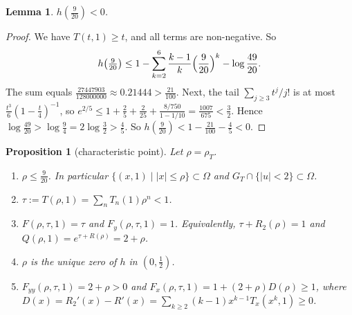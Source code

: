 \documentclass[11pt]{amsart}
\newtheorem{lemma}[theorem]{Lemma}
\newtheorem{proposition}[theorem]{Proposition}
\theoremstyle{definition}
\theoremstyle{remark}
\numberwithin{equation}{section}
\newcommand{\abs}[1]{\lvert #1\rvert}
\begin{document}
\begin{lemma}\label{lem:h}
\(h(\frac9{20})<0\).
\end{lemma}

\begin{proof}
We have \(T(t,1)\ge t\), and all terms are non-negative. So
\[
h\bigl(\tfrac9{20}\bigr)\le1-\sum_{k=2}^{6}\frac{k-1}{k}\Bigl(\frac9{20}\Bigr)^k-\log\frac{49}{20}.
\]
The sum equals \(\frac{27447903}{128000000}\approx0.21444>\frac{21}{100}\). Next, the tail \(\sum_{j\ge3}t^j/j!\) is at most \(\frac{t^3}{6}(1-\frac t4)^{-1}\), so \(e^{2/5}\le1+\frac25+\frac2{25}+\frac{8/750}{1-1/10}=\frac{1007}{675}<\frac32\). Hence \(\log\frac{49}{20}>\log\frac94=2\log\frac32>\frac45\). So \(h(\frac9{20})<1-\frac{21}{100}-\frac45<0\).
\end{proof}

\begin{proposition}[characteristic point]\label{prop:char}
Let \(\rho=\rho_T\).
\begin{enumerate}
\item \(\rho\le\frac9{20}\). In particular \(\{(x,1)\mid\abs{x}\le\rho\}\subset\Omega\) and \(G_T\cap\{\abs{u}<2\}\subset\Omega\).
\item \(\tau:=T(\rho,1)=\sum_nT_n(1)\rho^n<1\).
\item \(F(\rho,\tau,1)=\tau\) and \(F_y(\rho,\tau,1)=1\). Equivalently, \(\tau+R_2(\rho)=1\) and \(Q(\rho,1)=e^{\tau+R(\rho)}=2+\rho\).
\item \(\rho\) is the unique zero of \(h\) in \((0,\frac12)\).
\item \(F_{yy}(\rho,\tau,1)=2+\rho>0\) and \(F_x(\rho,\tau,1)=1+(2+\rho)D(\rho)\ge1\), where \(D(x)=R_2'(x)-R'(x)=\sum_{k\ge2}(k-1)x^{k-1}T_x(x^k,1)\ge0\).
\end{enumerate}
\end{proposition}
\end{document}
